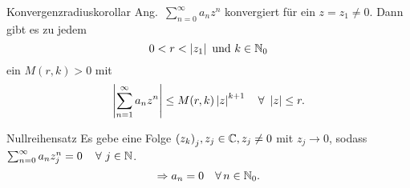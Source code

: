 \documentclass[main.tex]{subfiles}
\begin{document}
\begin{karte}{Konvergenzradiuskorollar}%
    Ang.\  \( \sum_{n=0}^\infty a_n z^n \) konvergiert 
    für ein \( z = z_1 \neq 0 \). Dann gibt es zu jedem
    \[ 0 < r < \left| z_1 \right| \text{ und } k\in\mathbb{N}_0\]
    ein \( M(r,k) > 0 \) mit
    \[ \abs{ \sum_{n=1}^\infty a_n z^n } 
    \leq M(r,k) \abs{z}^{k+1} \quad \forall \, \abs{z}\leq r. \]
\end{karte}
\begin{karte}{Nullreihensatz}
    Es gebe eine Folge \( {(z_k)}_j, z_j \in\mathbb{C}, z_j 
    \neq 0 \) mit \( z_j \rightarrow 0 \), sodass 
    \( \sum_{n=0}^\infty a_n z_j^n = 0 \quad \,\forall \, j\in\N \).
    \[ \Rightarrow a_n = 0 \quad \forall n\in\N_0. \]
\end{karte}
\end{document}
